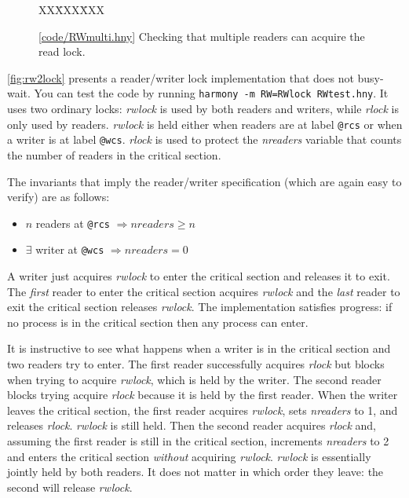 \documentclass{report}
\newcommand{\harmonysource}[1]{
\begin{tabbing}
XX\=XXX\=XXX\kill
    
\end{tabbing}
}
\newcommand{\harmonylink}[1]{%
[\href{https://www.cs.cornell.edu/home/rvr/harmony/#1}{\underline{#1}}]%
}
\newenvironment{code}{
\tcolorbox
}{
\endtcolorbox
}
\begin{document}
\begin{figure}
\begin{code}
\harmonysource{RWmulti}
\end{code}
\caption{\harmonylink{code/RWmulti.hny} Checking that multiple readers can acquire the read lock.}
\label{fig:rwmulti}
\end{figure}

\autoref{fig:rw2lock} presents a reader/writer lock implementation
that does not busy-wait.
You can test the code by running \texttt{harmony -m RW=RWlock RWtest.hny}.
It uses two ordinary locks: \textit{rwlock} is used by both readers and writers,
while \textit{rlock} is only used by readers.
\textit{rwlock} is held either when readers are at label \texttt{@rcs}
or when a writer is at label \texttt{@wcs}.
\textit{rlock} is used to protect the \textit{nreaders} variable that
counts the number of readers in the critical section. 

The invariants that imply the reader/writer specification
(which are again easy to verify) are as follows:

\begin{itemize}
\item $n$ readers at \texttt{@rcs} $\Rightarrow \mathit{nreaders} \ge n$
\item $\exists$ writer at \texttt{@wcs} $\Rightarrow \mathit{nreaders} = 0$
\end{itemize}

A writer just acquires \textit{rwlock} to enter the critical section
and releases it to exit.  The \emph{first} reader to enter the critical
section acquires \textit{rwlock} and the \emph{last} reader to exit
the critical section releases \textit{rwlock}.
The implementation satisfies progress: if no process is in the critical
section then any process can enter.

It is instructive to see what happens when a writer is in the critical
section and two readers try to enter.  The first reader successfully
acquires \textit{rlock} but blocks when trying to acquire
\textit{rwlock}, which is held by the writer.  The second reader blocks
trying acquire \textit{rlock} because it is held by the first reader.
When the writer leaves the critical section, the first reader acquires
\textit{rwlock}, sets \textit{nreaders} to 1, and releases \textit{rlock}.
\textit{rwlock} is still held.
Then the second reader acquires \textit{rlock} and, assuming the first
reader is still in the critical section, increments \textit{nreaders} to 2
and enters the critical section \emph{without} acquiring \textit{rwlock}.
\textit{rwlock} is essentially jointly held by both readers.
It does not matter in which order they leave: the second will release
\textit{rwlock}.
\end{document}
